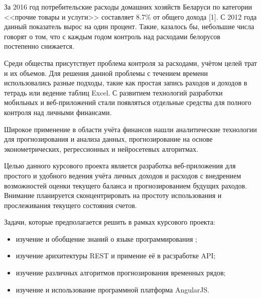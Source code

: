 
За 2016 год потребительские расходы домашних хозяйств Беларуси по категории 
<<прочие товары и услуги>> составляет 8.7\% от общего дохода [1]. С 2012 года данный показатель
вырос на один процент. Такие, казалось бы, небольшие числа говорят о том, что с каждым годом
контроль над расходами белорусов постепенно снижается.

Среди общества присутствует проблема контроля за расходами, учётом целей трат и их 
объемов. Для решения данной проблемы с течением времени использовались разные подходы, 
такие как простая запись раходов и доходов в тетрадь или ведение таблиц Excel.
С развитием технологий разработки мобильных и веб-приложений стали появляться отдельные 
средства для полного контроля над личными финансами.

Широкое применение в области учёта финансов нашли аналитические технологии для прогнозирования
и анализа данных, прогнозирование на основе эконометрических, регрессионных и нейросетевых
алгоритмах.

Целью данного курсового проекта является разработка веб-приложения для простого и удобного 
ведения учёта личных доходов и расходов с внедрением возможностей оценки текущего баланса
и прогнозированием будущих раходов. Внимание планируется сконцентрировать на простоту 
использования и прослеживания текущего состояния счетов.

Задачи, которые предполагается решить в рамках курсового проекта:
\begin{itemize}
	\item изучение и обобщение знаний о языке программирования \kt{};
	\item изучение арихитектуры REST и примение её в расзработке API;
	\item изучение различных алгоритмов прогнозирования временных \mbox{рядов};
	\item изучение и использование программной платформа AngularJS.
\end{itemize}